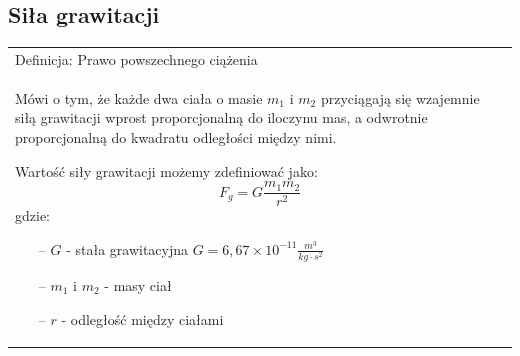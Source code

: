 \documentclass[a4paper]{article}
\newenvironment{definition}[2][Definicja]
    {
        \begin{center}
        \begin{tabular}{|p{1\textwidth}|}
        \hline
            #1: #2\\[2ex]
        \begin{em}
        \Large
    }
    { 
        \end{em}
        \\\hline
        \end{tabular} 
        \end{center}
    }
\begin{document}
    \subsection{\LARGE Siła grawitacji}
    \begin{definition}{Prawo powszechnego ciążenia}
        Mówi o tym, że każde dwa ciała o masie $m_1$ i $m_2$ przyciągają się wzajemnie siłą grawitacji 
        wprost proporcjonalną do iloczynu mas, a odwrotnie proporcjonalną do kwadratu odległości między nimi.

        Wartość siły grawitacji możemy zdefiniować jako:
        \[F_g = G\frac{m_1m_2}{r^2}\]
        gdzie:
        \begin{itemize}
            \item[--] $G$ - stała grawitacyjna $G = 6,67\times 10^{-11} \frac{m^3}{kg \cdot s^2}$
            \item[--] $m_1$ i $m_2$ - masy ciał
            \item[--] $r$ - odległość między ciałami  
        \end{itemize}
    \end{definition}
\end{document}
